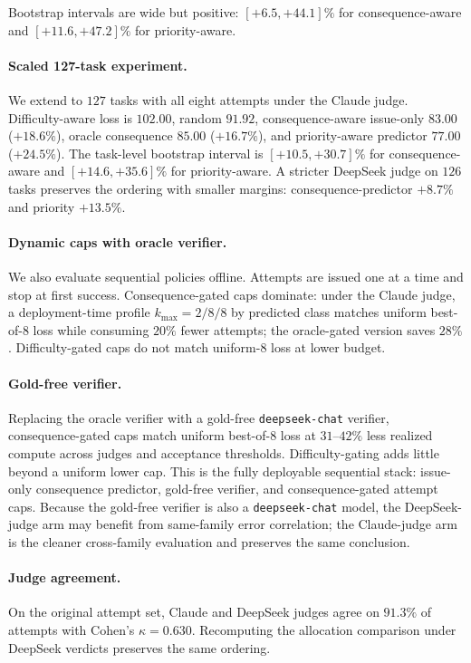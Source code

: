 \documentclass{article}
\begin{document}
Bootstrap intervals are wide but positive: $[+6.5,+44.1]\%$ for
consequence-aware and $[+11.6,+47.2]\%$ for priority-aware.

\paragraph{Scaled 127-task experiment.}
We extend to $127$ tasks with all eight attempts under the Claude
judge. Difficulty-aware loss is $102.00$, random $91.92$,
consequence-aware issue-only $83.00$ ($+18.6\%$), oracle consequence
$85.00$ ($+16.7\%$), and priority-aware predictor $77.00$
($+24.5\%$). The task-level bootstrap interval is
$[+10.5,+30.7]\%$ for consequence-aware and $[+14.6,+35.6]\%$ for
priority-aware. A stricter DeepSeek judge on $126$ tasks preserves the
ordering with smaller margins: consequence-predictor $+8.7\%$ and
priority $+13.5\%$.

\paragraph{Dynamic caps with oracle verifier.}
We also evaluate sequential policies offline. Attempts are issued one
at a time and stop at first success. Consequence-gated caps dominate:
under the Claude judge, a deployment-time profile
$k_{\max}=2/8/8$ by predicted class matches uniform best-of-$8$ loss
while consuming $20\%$ fewer attempts; the oracle-gated version saves
$28\%$. Difficulty-gated caps do not match uniform-$8$ loss at lower
budget.

\paragraph{Gold-free verifier.}
Replacing the oracle verifier with a gold-free \texttt{deepseek-chat}
verifier, consequence-gated caps match uniform best-of-$8$ loss at
$31$--$42\%$ less realized compute across judges and acceptance
thresholds. Difficulty-gating adds little beyond a uniform lower cap.
This is the fully deployable sequential stack: issue-only consequence
predictor, gold-free verifier, and consequence-gated attempt caps.
Because the gold-free verifier is also a \texttt{deepseek-chat} model,
the DeepSeek-judge arm may benefit from same-family error correlation;
the Claude-judge arm is the cleaner cross-family evaluation and
preserves the same conclusion.

\paragraph{Judge agreement.}
On the original attempt set, Claude and DeepSeek judges agree on
$91.3\%$ of attempts with Cohen's $\kappa=0.630$. Recomputing the
allocation comparison under DeepSeek verdicts preserves the same
ordering.
\end{document}
